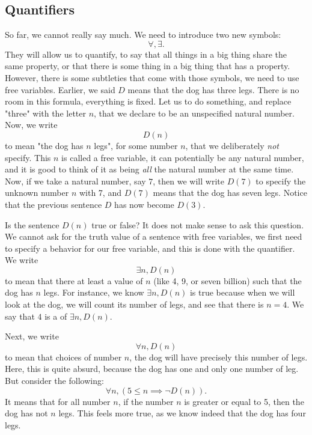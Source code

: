 \subsection{Quantifiers}

So far, we cannot really say much. We need to introduce two new symbols:
\begin{equation*}
    \forall, \exists.
\end{equation*}
They will allow us to quantify, to say that all things in a big thing share the same property, or that there is some thing in a big thing that has a property. However, there is some subtleties that come with those symbols, we need to use free variables. Earlier, we said \( D \) means that the dog has three legs. There is no room in this formula, everything is fixed. Let us to do something, and replace "three" with the letter \( n \), that we declare to be an unspecified natural number. Now, we write 
\begin{equation*}
    D(n)
\end{equation*}  
to mean "the dog has \( n \) legs", for some number \( n \), that we deliberately \textit{not} specify. This \( n \) is called a free variable, it can potentially be any natural number, and it is good to think of it as being \textit{all} the natural number at the same time. Now, if we take a natural number, say \( 7 \), then we will write \( D(7) \) to specify the unknown number \( n \) with 7, and \( D(7) \) means that the dog has seven legs. Notice that the previous sentence \( D \) has now become \( D(3) \). 

Is the sentence \( D(n) \) true or false? It does not make sense to ask this question. We cannot ask for the truth value of a sentence with free variables, we first need to specify a behavior for our free variable, and this is done with the quantifier. We write
\begin{equation*}
    \exists n, D(n)
\end{equation*}
to mean that there  at least a value of \( n \) (like 4, 9, or seven billion) such that the dog has \( n \) legs. For instance, we know \( \exists n, D(n) \) is true because when we will look at the dog, we will count its number of legs, and see that there is \( n = 4 \). We say that \( 4 \) is a  of \( \exists n, D(n) \). 

Next, we write
\begin{equation*}
    \forall n, D(n)
\end{equation*}
to mean that  choices of number \( n \), the dog will have precisely this number of legs. Here, this is quite absurd, because the dog has one and only one number of leg. But consider the following:
\begin{equation*}
    \forall n, (5 \leq n \implies \neg D(n)).
\end{equation*} 
It means that for all number \( n \), if the number \( n \) is greater or equal to 5, then the dog has not \( n \) legs. This feels more true, as we know indeed that the dog has four legs. 


